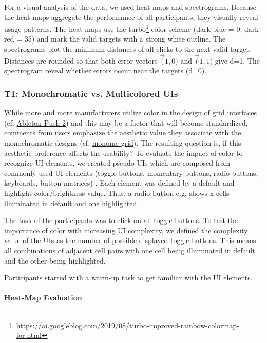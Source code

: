 \documentclass[sigconf]{nimeart}
\begin{document}
For a visual analysis of the data, we used heat-maps and spectrograms. Because the heat-maps aggregate the performance of all participants, they visually reveal usage patterns. The heat-maps use the turbo\footnote{\href{}{https://ai.googleblog.com/2019/08/turbo-improved-rainbow-colormap-for.html}} color scheme (dark-blue = 0; dark-red = 35) and mark the valid targets with a strong white outline. The spectrograms plot the minimum distances of all clicks to the next valid target. Distances are rounded so that both error vectors $\vec(1, 0)$ and $\vec(1, 1)$ give d=1. The spectrogram reveal whether errors occur near the targets (d=0).

\subsubsection{\texorpdfstring{\textbf{T1}: Monochromatic vs. Multicolored UIs}{T1: Monochromatic vs. Multicolored UIs}}\label{t1-monochromatic-vs.-multicolored-uis}

While more and more manufacturers utilize color in the design of grid interfaces (cf. \href{https://www.ableton.com/en/push/}{Ableton Push 2}) and this may be a factor that will become standardized, comments from users emphasize the aesthetic value they associate with the monochromatic designs (cf. \href{https://monome.org/docs/grid/}{monome grid}). The resulting question is, if this aesthetic preference affects the usability? To evaluate the impact of color to recognize UI elements, we created pseudo UIs which are composed from commonly used UI elements (toggle-buttons, momentary-buttons, radio-buttons, keyboards, button-matrices) \cite{RossmyButtons}. Each element was defined by a default and highlight color/brightness value. Thus, a radio-button e.g. shows x cells illuminated in default and one highlighted.

The task of the participants was to click on all toggle-buttons. To test the importance of color with increasing UI complexity, we defined the complexity value of the UIs as the number of possible displayed toggle-buttons. This means all combinations of adjacent cell pairs with one cell being illuminated in default and the other being highlighted.

Participants started with a warm-up task to get familiar with the UI elements.

\paragraph{Heat-Map Evaluation}\label{heat-map-evaluation}
\end{document}
